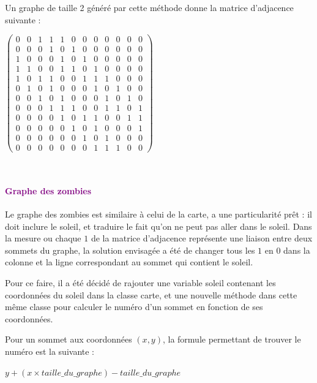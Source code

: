 \documentclass{report}
\begin{document}
			Un graphe de taille 2 généré par cette méthode donne la matrice d'adjacence suivante : 
			\\
			\begin{center}
			\setcounter{MaxMatrixCols}{13}
$					\begin{pmatrix}
			0&0&1&1&1&0&0&0&0&0&0&0\\
			0&0&0&1&0&1&0&0&0&0&0&0\\
			1&0&0&0&1&0&1&0&0&0&0&0\\
			1&1&0&0&1&1&0&1&0&0&0&0\\
			1&0&1&1&0&0&1&1&1&0&0&0\\
			0&1&0&1&0&0&0&1&0&1&0&0\\
			0&0&1&0&1&0&0&0&1&0&1&0\\
			0&0&0&1&1&1&0&0&1&1&0&1\\
			0&0&0&0&1&0&1&1&0&0&1&1\\
			0&0&0&0&0&1&0&1&0&0&0&1\\
			0&0&0&0&0&0&1&0&1&0&0&0\\
			0&0&0&0&0&0&0&1&1&1&0&0		
				\end{pmatrix}$
			\end{center}\\								
			

			
			\paragraph{\textcolor{purple}{Graphe des zombies}}
				
				Le graphe des zombies est similaire à celui de la carte, a une particularité prêt : il doit inclure le soleil, et traduire le fait qu'on ne peut pas aller dans le soleil. Dans la mesure ou chaque  $1$ de la matrice d'adjacence représente une liaison entre deux sommets du graphe, la solution envisagée a été de changer tous les $1$ en $0$ dans la colonne et la ligne correspondant au sommet qui contient le soleil.
				
				Pour ce faire, il a été décidé de rajouter une variable soleil contenant les coordonnées du soleil dans la classe carte, et une nouvelle méthode dans cette même classe pour calculer le numéro d'un sommet en fonction de ses coordonnées.
				
				Pour un sommet aux coordonnées $(x,y)$, la formule permettant de trouver le numéro est la suivante :
				
				\begin{center}
				 $ y+(x\times taille\_du\_graphe) - taille\_du\_graphe$			
				 \end{center}
	
\end{document}
